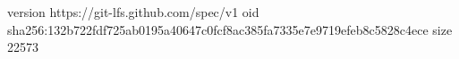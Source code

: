 version https://git-lfs.github.com/spec/v1
oid sha256:132b722fdf725ab0195a40647c0fcf8ac385fa7335e7e9719efeb8c5828c4ece
size 22573
